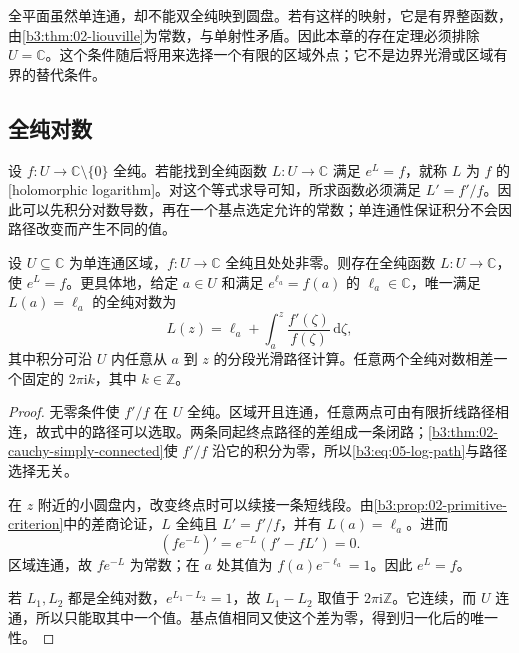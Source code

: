 \ProseParagraphBreak

全平面虽然单连通，却不能双全纯映到圆盘。若有这样的映射，它是有界整函数，由\cref{b3:thm:02-liouville}为常数，与单射性矛盾。因此本章的存在定理必须排除 \(U=\mathbb C\)。这个条件随后将用来选择一个有限的区域外点；它不是边界光滑或区域有界的替代条件。

\subsection{全纯对数}
\label{b3:subsec:050102}

设 \(f:U\to\mathbb C\setminus\{0\}\) 全纯。若能找到全纯函数 \(L:U\to\mathbb C\) 满足 \(e^L=f\)，就称 \(L\) 为 \(f\) 的[holomorphic logarithm]。对这个等式求导可知，所求函数必须满足 \(L'=f'/f\)。因此可以先积分对数导数，再在一个基点选定允许的常数；单连通性保证积分不会因路径改变而产生不同的值。

\begin{theorem}[全纯对数]\label{b3:thm:05-holomorphic-log}
设 \(U\subseteq\mathbb C\) 为单连通区域，\(f:U\to\mathbb C\) 全纯且处处非零。则存在全纯函数 \(L:U\to\mathbb C\)，使 \(e^L=f\)。更具体地，给定 \(a\in U\) 和满足 \(e^{\ell_a}=f(a)\) 的 \(\ell_a\in\mathbb C\)，唯一满足 \(L(a)=\ell_a\) 的全纯对数为
\begin{equation}\label{b3:eq:05-log-path}
 L(z)=\ell_a+\int_a^z\frac{f'(\zeta)}{f(\zeta)}\,\mathrm{d}\zeta,
\end{equation}
其中积分可沿 \(U\) 内任意从 \(a\) 到 \(z\) 的分段光滑路径计算。任意两个全纯对数相差一个固定的 \(2\pi\mathrm{i}k\)，其中 \(k\in\mathbb Z\)。
\end{theorem}
\begin{proof}
无零条件使 \(f'/f\) 在 \(U\) 全纯。区域开且连通，任意两点可由有限折线路径相连，故式中的路径可以选取。两条同起终点路径的差组成一条闭路；\cref{b3:thm:02-cauchy-simply-connected}使 \(f'/f\) 沿它的积分为零，所以\eqref{b3:eq:05-log-path}与路径选择无关。

在 \(z\) 附近的小圆盘内，改变终点时可以续接一条短线段。由\cref{b3:prop:02-primitive-criterion}中的差商论证，\(L\) 全纯且 \(L'=f'/f\)，并有 \(L(a)=\ell_a\)。进而
\[
 (fe^{-L})'=e^{-L}(f'-fL')=0.
\]
区域连通，故 \(fe^{-L}\) 为常数；在 \(a\) 处其值为 \(f(a)e^{-\ell_a}=1\)。因此 \(e^L=f\)。

若 \(L_1,L_2\) 都是全纯对数，\(e^{L_1-L_2}=1\)，故 \(L_1-L_2\) 取值于 \(2\pi\mathrm{i}\mathbb Z\)。它连续，而 \(U\) 连通，所以只能取其中一个值。基点值相同又使这个差为零，得到归一化后的唯一性。
\end{proof}

